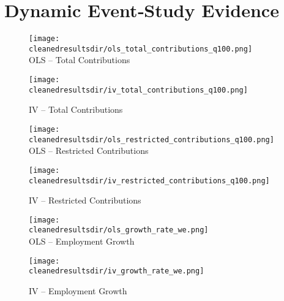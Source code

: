 \documentclass{article}
\newcommand{\cleanedresultsdir}{../results/cleaned}
\begin{document}

\clearpage
\section{Dynamic Event‐Study Evidence}


\begin{figure}[H]
  \centering
  \texttt{[image: \\cleanedresultsdir/ols\_total\_contributions\_q100.png]}\\[2pt]
  \caption*{OLS – Total Contributions}
  \texttt{[image: \\cleanedresultsdir/iv\_total\_contributions\_q100.png]}\\[2pt]
  \caption*{IV – Total Contributions}
\end{figure}

\clearpage

\begin{figure}[H]
  \centering
  \texttt{[image: \\cleanedresultsdir/ols\_restricted\_contributions\_q100.png]}\\[2pt]
  \caption*{OLS – Restricted Contributions}
  \texttt{[image: \\cleanedresultsdir/iv\_restricted\_contributions\_q100.png]}\\[2pt]
  \caption*{IV – Restricted Contributions}
\end{figure}

\clearpage


\begin{figure}[H]
  \centering
  \texttt{[image: \\cleanedresultsdir/ols\_growth\_rate\_we.png]}\\[2pt]
  \caption*{OLS – Employment Growth}
  \texttt{[image: \\cleanedresultsdir/iv\_growth\_rate\_we.png]}\\[2pt]
  \caption*{IV – Employment Growth}
\end{figure}
\end{document}
